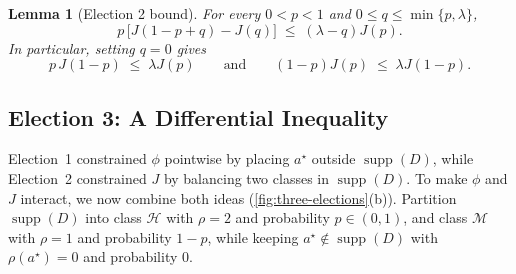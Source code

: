 \documentclass[11pt]{article}
\numberwithin{equation}{section}
\theoremstyle{plain}
\newtheorem{lemma}[theorem]{Lemma}
\theoremstyle{definition}
\newcommand{\1}{\mathbf{1}}
\newcommand{\supp}{\operatorname{supp}}
\newcommand{\calH}{\mathcal{H}}
\newcommand{\calM}{\mathcal{M}}
\begin{document}
\begin{lemma}[Election 2 bound]
\label{lem:election-2}
For every $0 < p < 1$ and $0 \le q \le \min\{p, \lambda\}$,
\begin{equation}
  p\,\bigl[J(1 - p + q) - J(q)\bigr] \;\le\; (\lambda - q)J(p).
  \label{eq:two-class}
\end{equation}
In particular, setting $q = 0$ gives
\begin{equation}
  p\,J(1 - p) \;\le\; \lambda J(p)
  \qquad\text{and}\qquad
  (1 - p)J(p) \;\le\; \lambda J(1 - p).
  \label{eq:two-class-zero}
\end{equation}
\end{lemma}

\subsection{Election 3: A Differential Inequality}
\label{sec:election-3}

Election~1 constrained $\phi$ pointwise by placing $a^\star$ outside $\supp(D)$, while Election~2 constrained $J$ by balancing two classes in $\supp(D)$. To make $\phi$ and $J$ interact, we now combine both ideas (\cref{fig:three-elections}(b)). Partition $\supp(D)$ into class $\calH$ with $\rho = 2$ and probability $p \in (0, 1)$, and class $\calM$ with $\rho = 1$ and probability $1 - p$, while keeping $a^\star \notin \supp(D)$ with $\rho(a^\star) = 0$ and probability $0$.
\end{document}
